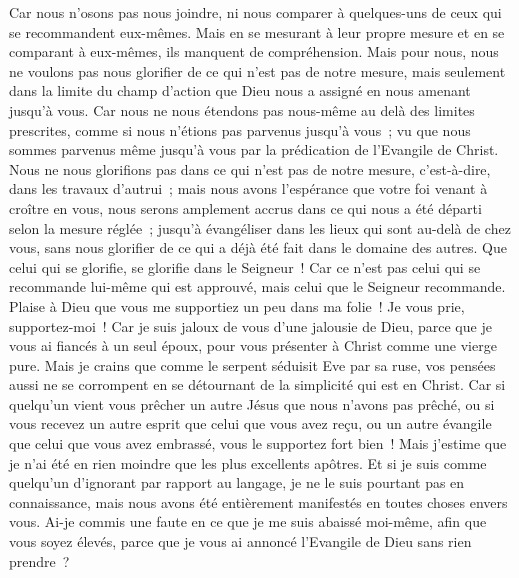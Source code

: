 \begin{multicols}{2}
Car nous n'osons pas nous joindre, ni nous comparer à quelques-uns de ceux qui se recommandent eux-mêmes. Mais en se mesurant à leur propre mesure et en se comparant à eux-mêmes, ils manquent de compréhension.
Mais pour nous, nous ne voulons pas nous glorifier de ce qui n'est pas de notre mesure, mais seulement dans la limite du champ d'action que Dieu nous a assigné en nous amenant jusqu'à vous.
Car nous ne nous étendons pas nous-même au delà des limites prescrites, comme si nous n'étions pas parvenus jusqu'à vous~; vu que nous sommes parvenus même jusqu'à vous par la prédication de l'Evangile de Christ.
Nous ne nous glorifions pas dans ce qui n'est pas de notre mesure, c'est-à-dire, dans les travaux d'autrui~; mais nous avons l'espérance que votre foi venant à croître en vous, nous serons amplement accrus dans ce qui nous a été départi selon la mesure réglée~;
jusqu'à évangéliser dans les lieux qui sont au-delà de chez vous, sans nous glorifier de ce qui a déjà été fait dans le domaine des autres.
Que celui qui se glorifie, se glorifie dans le Seigneur~!
Car ce n'est pas celui qui se recommande lui-même qui est approuvé, mais celui que le Seigneur recommande.
\VerseOne{}Plaise à Dieu que vous me supportiez un peu dans ma folie~! Je vous prie, supportez-moi~!
Car je suis jaloux de vous d'une jalousie de Dieu, parce que je vous ai fiancés à un seul époux, pour vous présenter à Christ comme une vierge pure.
Mais je crains que comme le serpent séduisit Eve par sa ruse, vos pensées aussi ne se corrompent en se détournant de la simplicité qui est en Christ.
Car si quelqu'un vient vous prêcher un autre Jésus que nous n'avons pas prêché, ou si vous recevez un autre esprit que celui que vous avez reçu, ou un autre évangile que celui que vous avez embrassé, vous le supportez fort bien~!
Mais j'estime que je n'ai été en rien moindre que les plus excellents apôtres.
Et si je suis comme quelqu'un d'ignorant par rapport au langage, je ne le suis pourtant pas en connaissance, mais nous avons été entièrement manifestés en toutes choses envers vous.
Ai-je commis une faute en ce que je me suis abaissé moi-même, afin que vous soyez élevés, parce que je vous ai annoncé l'Evangile de Dieu sans rien prendre~? 

\end{multicols}
